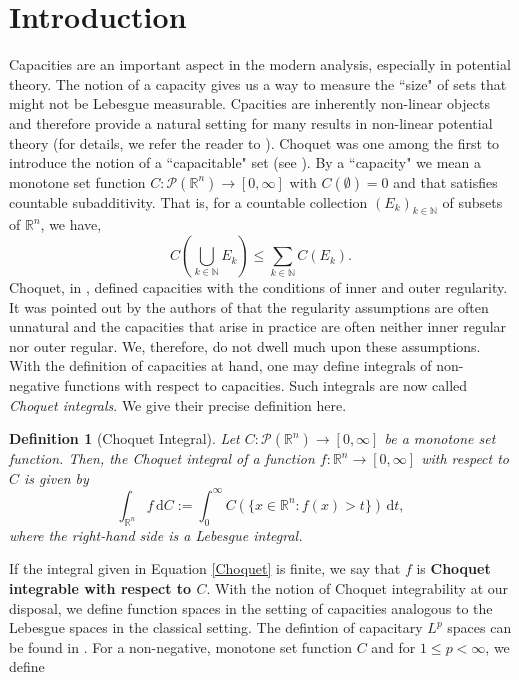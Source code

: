 \documentclass{amsart}
\newtheorem{definition}[theorem]{Definition}
\numberwithin{theorem}{section}
\numberwithin{equation}{section}
\begin{document}
	\section{Introduction}
		\label{IntroductionSection}
		Capacities are an important aspect in the modern analysis, especially in potential theory. The notion of a capacity gives us a way to measure the ``size" of sets that might not be Lebesgue measurable. Cpacities are inherently non-linear objects and therefore provide a natural setting for many results in non-linear potential theory (for details, we refer the reader to \cite{Adams}). Choquet was one among the first to introduce the notion of a ``capacitable" set (see \cite{Choquet}). By a ``capacity" we mean a monotone set function $C: \mathcal{P} \left( \mathbb{R}^n \right) \rightarrow \left[ 0, \infty \right]$ with $C \left( \emptyset \right) = 0$ and that satisfies countable subadditivity. That is, for a countable collection $\left( E_k \right)_{k \in \mathbb{N}}$ of subsets of $\mathbb{R}^n$, we have,
		$$C \left( \bigcup\limits_{k \in \mathbb{N}} E_k \right) \leq \sum\limits_{k \in \mathbb{N}} C \left( E_k \right).$$
		Choquet, in \cite{Choquet}, defined capacities with the conditions of inner and outer regularity. It was pointed out by the authors of \cite{PonceSpector} that the regularity assumptions are often unnatural and the capacities that arise in practice are often neither inner regular nor outer regular. We, therefore, do not dwell much upon these assumptions. With the definition of capacities at hand, one may define integrals of non-negative functions with respect to capacities. Such integrals are now called \textit{Choquet integrals}. We give their precise definition here.
		\begin{definition}[Choquet Integral]
			\label{ChoquetIntegralDefinition}
			Let $C: \mathcal{P}(\mathbb{R}^n) \to [0,\infty]$ be a monotone set function. Then, the Choquet integral of a function $f : \mathbb{R}^n \to [0,\infty]$ with respect to $C$ is given by
			\begin{equation}\label{Choquet}
				\int_{\mathbb{R}^n} f\,\mathrm{d}C := \int_{0}^{\infty} C(\{x \in \mathbb{R}^n : f(x) > t\})\,\mathrm{d}t,
			\end{equation}
			where the right-hand side is a Lebesgue integral.
		\end{definition}
		If the integral given in Equation \eqref{Choquet} is finite, we say that $f$ is \textbf{Choquet integrable with respect to $C$}. With the notion of Choquet integrability at our disposal, we define function spaces in the setting of capacities analogous to the Lebesgue spaces in the classical setting. The defintion of capacitary $L^p$ spaces can be found in \cite{SpectorMaximal}. For a non-negative, monotone set function $C$ and for $1\leq p < \infty$, we define 
\end{document}
